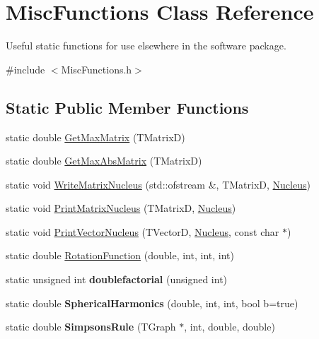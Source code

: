 \hypertarget{classMiscFunctions}{\section{Misc\-Functions Class Reference}
\label{classMiscFunctions}
}


Useful static functions for use elsewhere in the software package.  




{\ttfamily \#include $<$Misc\-Functions.\-h$>$}

\subsection*{Static Public Member Functions}
\begin{DoxyCompactItemize}
\item 
static double \hyperlink{classMiscFunctions_a94aa5dcad8b420d3b3e09554d42d8fc8}{Get\-Max\-Matrix} (T\-Matrix\-D)
\item 
static double \hyperlink{classMiscFunctions_a013c73579d32d966d225b96304d39dda}{Get\-Max\-Abs\-Matrix} (T\-Matrix\-D)
\item 
static void \hyperlink{classMiscFunctions_a53cef6044e7ce41d37789c2c76948226}{Write\-Matrix\-Nucleus} (std\-::ofstream \&, T\-Matrix\-D, \hyperlink{classNucleus}{Nucleus})
\item 
static void \hyperlink{classMiscFunctions_af49d629dced5a9125091a92bed3a4a0e}{Print\-Matrix\-Nucleus} (T\-Matrix\-D, \hyperlink{classNucleus}{Nucleus})
\item 
static void \hyperlink{classMiscFunctions_a6c137b98015696ba93abab4f31bcbb6b}{Print\-Vector\-Nucleus} (T\-Vector\-D, \hyperlink{classNucleus}{Nucleus}, const char $\ast$)
\item 
static double \hyperlink{classMiscFunctions_a91d1bb1bc78782da9523392de913efe9}{Rotation\-Function} (double, int, int, int)
\item 
\hypertarget{classMiscFunctions_aa0737f75b4e2e511f67e51fd51f1a897}{static unsigned int {\bfseries doublefactorial} (unsigned int)}\label{classMiscFunctions_aa0737f75b4e2e511f67e51fd51f1a897}

\item 
\hypertarget{classMiscFunctions_a8d5d0375b3d7f48877572368e1cd605f}{static double {\bfseries Spherical\-Harmonics} (double, int, int, bool b=true)}\label{classMiscFunctions_a8d5d0375b3d7f48877572368e1cd605f}

\item 
\hypertarget{classMiscFunctions_a069d0139e00238f697b837a55f8c5616}{static double {\bfseries Simpsons\-Rule} (T\-Graph $\ast$, int, double, double)}\label{classMiscFunctions_a069d0139e00238f697b837a55f8c5616}

\end{DoxyCompactItemize}
